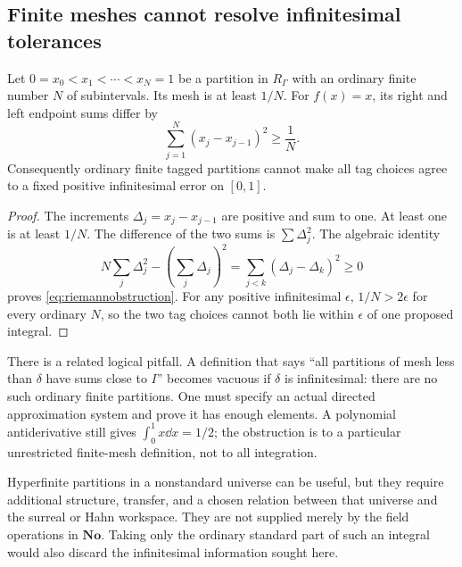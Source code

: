 \documentclass[11pt,letterpaper]{article}
\theoremstyle{definition}
\theoremstyle{remark}
\newcommand{\No}{\mathbf{No}}\newcommand{\SC}{\mathbf{SC}}
\numberwithin{equation}{section}
\begin{document}
\subsection{Finite meshes cannot resolve infinitesimal tolerances}
\begin{proposition}\label{prop:mesh}
Let $0=x_0<x_1<\cdots<x_N=1$ be a partition in $R_\Gamma$ with an ordinary finite number $N$ of subintervals. Its mesh is at least $1/N$. For $f(x)=x$, its right and left endpoint sums differ by
\begin{equation}\label{eq:riemannobstruction}
 \sum_{j=1}^N(x_j-x_{j-1})^2\ge\frac1N.
\end{equation}
Consequently ordinary finite tagged partitions cannot make all tag choices agree to a fixed positive infinitesimal error on $[0,1]$.
\end{proposition}
\begin{proof}
The increments $\Delta_j=x_j-x_{j-1}$ are positive and sum to one. At least one is at least $1/N$. The difference of the two sums is $\sum\Delta_j^2$. The algebraic identity
\[
 N\sum_j\Delta_j^2-\left(\sum_j\Delta_j\right)^2
 =\sum_{j<k}(\Delta_j-\Delta_k)^2\ge0
\]
proves \eqref{eq:riemannobstruction}. For any positive infinitesimal $\epsilon$, $1/N>2\epsilon$ for every ordinary $N$, so the two tag choices cannot both lie within $\epsilon$ of one proposed integral.
\end{proof}

There is a related logical pitfall. A definition that says ``all partitions of mesh less than $\delta$ have sums close to $I$'' becomes vacuous if $\delta$ is infinitesimal: there are no such ordinary finite partitions. One must specify an actual directed approximation system and prove it has enough elements. A polynomial antiderivative still gives $\int_0^1x\dd x=1/2$; the obstruction is to a particular unrestricted finite-mesh definition, not to all integration.

Hyperfinite partitions in a nonstandard universe can be useful, but they require additional structure, transfer, and a chosen relation between that universe and the surreal or Hahn workspace. They are not supplied merely by the field operations in $\No$. Taking only the ordinary standard part of such an integral would also discard the infinitesimal information sought here.
\end{document}
